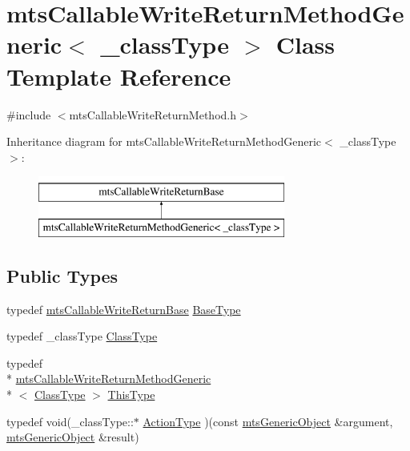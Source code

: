 \hypertarget{classmts_callable_write_return_method_generic}{\section{mts\-Callable\-Write\-Return\-Method\-Generic$<$ \-\_\-class\-Type $>$ Class Template Reference}
\label{classmts_callable_write_return_method_generic}
}


{\ttfamily \#include $<$mts\-Callable\-Write\-Return\-Method.\-h$>$}

Inheritance diagram for mts\-Callable\-Write\-Return\-Method\-Generic$<$ \-\_\-class\-Type $>$\-:\begin{figure}[H]
\begin{center}
\leavevmode
\includegraphics[height=2.000000cm]{d9/dac/classmts_callable_write_return_method_generic}
\end{center}
\end{figure}
\subsection*{Public Types}
\begin{DoxyCompactItemize}
\item 
typedef \hyperlink{classmts_callable_write_return_base}{mts\-Callable\-Write\-Return\-Base} \hyperlink{classmts_callable_write_return_method_generic_a45af3bcddc1608f32979dd6770b341ad}{Base\-Type}
\item 
typedef \-\_\-class\-Type \hyperlink{classmts_callable_write_return_method_generic_a32ecf59575aa52541be0693586a2319d}{Class\-Type}
\item 
typedef \\*
\hyperlink{classmts_callable_write_return_method_generic}{mts\-Callable\-Write\-Return\-Method\-Generic}\\*
$<$ \hyperlink{classmts_callable_write_return_method_generic_a32ecf59575aa52541be0693586a2319d}{Class\-Type} $>$ \hyperlink{classmts_callable_write_return_method_generic_a628ed9547287aad4710fa55e37070f04}{This\-Type}
\item 
typedef void(\-\_\-class\-Type\-::$\ast$ \hyperlink{classmts_callable_write_return_method_generic_a4316e9ab3973c5b01799864a32167400}{Action\-Type} )(const \hyperlink{classmts_generic_object}{mts\-Generic\-Object} \&argument, \hyperlink{classmts_generic_object}{mts\-Generic\-Object} \&result)
\end{DoxyCompactItemize}
